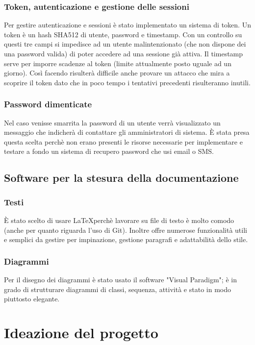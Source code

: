 \documentclass[12pt]{scrartcl}
\begin{document}
\subsubsection{Token, autenticazione e gestione delle sessioni}
    Per gestire autenticazione e sessioni \`e stato implementato un sistema di
    token. Un token \`e un hash SHA512 di utente, password e timestamp. Con un controllo
    su questi tre campi si impedisce ad un utente malintenzionato (che non dispone dei una
    password valida) di poter accedere ad una sessione gi\`a attiva. 
    Il timestamp serve per imporre scadenze al token (limite attualmente posto
    uguale ad un giorno). Cos\`i facendo risulter\`a difficile anche provare un
    attacco che mira a scoprire il token dato che in poco tempo i tentativi precedenti
    risulteranno inutili.
\subsubsection{Password dimenticate}
    Nel caso venisse smarrita la password di un utente verr\`a visualizzato
    un messaggio che indicher\`a di contattare gli amministratori di 
    sistema. \`E stata presa questa scelta perch\`e non erano presenti
    le risorse necessarie per implementare e testare a fondo un sistema
    di recupero password che usi email o SMS.

\subsection{Software per la stesura della documentazione}
\subsubsection{Testi}
    \`E stato scelto di usare \LaTeX perch\`e lavorare su file di testo \`e molto
    comodo (anche per quanto riguarda l'uso di Git). Inoltre offre numerose
    funzionalit\`a utili e semplici da gestire per impinazione, gestione paragrafi
    e adattabilit\`a dello stile.
\subsubsection{Diagrammi}
    Per il disegno dei diagrammi \`e stato usato il software "Visual Paradigm";
    \`e in grado di strutturare diagrammi di classi, sequenza, attivit\`a e
    stato in modo piuttosto elegante.

\section{Ideazione del progetto}
\end{document}
